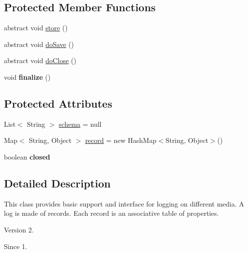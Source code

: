 \subsection*{Protected Member Functions}
\begin{DoxyCompactItemize}
\item 
abstract void \hyperlink{classjenes_1_1utils_1_1_abstract_logger_a6acf83a83999e26ae4ed45cbf355111b}{store} ()
\item 
abstract void \hyperlink{classjenes_1_1utils_1_1_abstract_logger_a41fcd50b050c467fe1b413fc5b49c167}{do\-Save} ()
\item 
abstract void \hyperlink{classjenes_1_1utils_1_1_abstract_logger_a5253672b3f3f81287db2fc604ca921a9}{do\-Close} ()
\item 
\hypertarget{classjenes_1_1utils_1_1_abstract_logger_af2c45f653c6e5e79bc4e85dc3ecc4ab4}{void {\bfseries finalize} ()}\label{classjenes_1_1utils_1_1_abstract_logger_af2c45f653c6e5e79bc4e85dc3ecc4ab4}

\end{DoxyCompactItemize}
\subsection*{Protected Attributes}
\begin{DoxyCompactItemize}
\item 
List$<$ String $>$ \hyperlink{classjenes_1_1utils_1_1_abstract_logger_a3a2030876857a0512fae7e0ad400c570}{schema} = null
\item 
Map$<$ String, Object $>$ \hyperlink{classjenes_1_1utils_1_1_abstract_logger_ae85e356ad12255a9c5ec8f9f25659ef7}{record} = new Hash\-Map$<$String, Object$>$()
\item 
\hypertarget{classjenes_1_1utils_1_1_abstract_logger_a68fe91d1c7bad9146db3bddd92bbcab3}{boolean {\bfseries closed}}\label{classjenes_1_1utils_1_1_abstract_logger_a68fe91d1c7bad9146db3bddd92bbcab3}

\end{DoxyCompactItemize}


\subsection{Detailed Description}
This class provides basic support and interface for logging on different media. A log is made of records. Each record is an associative table of properties.

\begin{DoxyVersion}{Version}
2. 
\end{DoxyVersion}
\begin{DoxySince}{Since}
1. 
\end{DoxySince}


